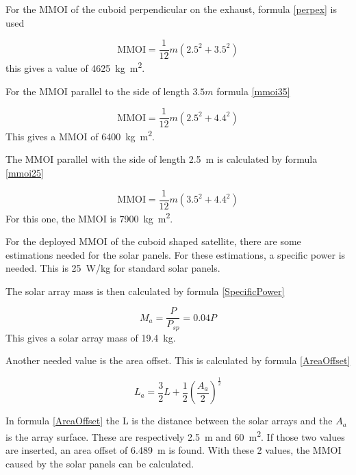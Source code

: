 
For the MMOI of the cuboid perpendicular on the exhaust, formula
\ref{perpex} is used

\begin{equation}
  \label{perpex}
  \mathrm{MMOI}=\frac{1}{12}m(2.5^2+3.5^2)
\end{equation}
this gives a value of \SI{4625}{kg.m^2}.

For the MMOI parallel to the side of length $3.5m$ formula \ref{mmoi35}

\begin{equation}
  \label{mmoi35}
  \mathrm{MMOI}=\frac{1}{12}m(2.5^2+4.4^2)
\end{equation}
This gives a MMOI of \SI{6400}{kg.m^2}.

The MMOI parallel with the side of length \SI{2.5}{m} is calculated by
formula \ref{mmoi25}

\begin{equation}
  \label{mmoi25}
  \mathrm{MMOI}=\frac{1}{12}m(3.5^2+4.4^2)
\end{equation}
For this one, the MMOI is \SI{7900}{kg.m^2}.

For the deployed MMOI of the cuboid shaped satellite, there are some
estimations needed for the solar panels. For these estimations, a
specific power is needed. This is \SI{25}{W/kg} for standard solar
panels. \cite{wertz1999space}

The solar array mass is then calculated by formula \ref{SpecificPower}

\begin{equation}
  \label{SpecificPower}
  M_a=\frac{P}{P_{sp}}=0.04 P
\end{equation}
This gives a solar array mass of \SI{19.4}{kg}.

Another needed value is the area offset. This is calculated by formula \ref{AreaOffset}

\begin{equation}
  \label{AreaOffset}
  L_a=\frac{3}{2}L+\frac{1}{2} \left(\frac{A_a}{2} \right)^{\frac{1}{2}}
\end{equation}

In formula \ref{AreaOffset} the L is the distance between the solar
arrays and the $A_a$ is the array surface. These are respectively
\SI{2.5}{m} and \SI{60}{m^2}. If those two values are inserted, an
area offset of \SI{6.489}{m} is found. With these 2 values, the MMOI
caused by the solar panels can be calculated.

